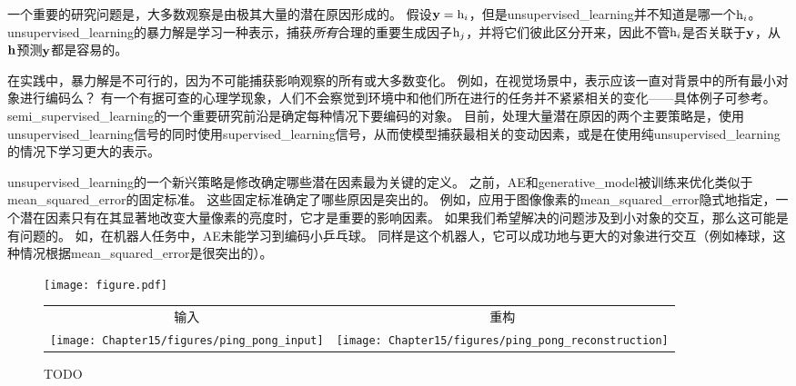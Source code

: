 一个重要的研究问题是，大多数观察是由极其大量的潜在原因形成的。
假设$\mathbf{y} = \mathrm{h}_i$，但是\gls{unsupervised_learning}并不知道是哪一个$\mathrm{h}_i$。
\gls{unsupervised_learning}的暴力解是学习一种表示，捕获\emph{所有}合理的重要生成因子$\mathrm{h}_j$，并将它们彼此区分开来，因此不管$\mathrm{h}_i$是否关联于$\mathbf{y}$，从$\mathbf{h}$预测$\mathbf{y}$都是容易的。


在实践中，暴力解是不可行的，因为不可能捕获影响观察的所有或大多数变化。
例如，在视觉场景中，表示应该一直对背景中的所有最小对象进行编码么？
有一个有据可查的心理学现象，人们不会察觉到环境中和他们所在进行的任务并不紧紧相关的变化——具体例子可参考\citep{simons1998failure}。
\gls{semi_supervised_learning}的一个重要研究前沿是确定每种情况下要编码的对象。
目前，处理大量潜在原因的两个主要策略是，使用\gls{unsupervised_learning}信号的同时使用\gls{supervised_learning}信号，从而使模型捕获最相关的变动因素，或是在使用纯\gls{unsupervised_learning}的情况下学习更大的表示。


\gls{unsupervised_learning}的一个新兴策略是修改确定哪些潜在因素最为关键的定义。
之前，\gls{AE}和\gls{generative_model}被训练来优化类似于\gls{mean_squared_error}的固定标准。
这些固定标准确定了哪些原因是突出的。
例如，应用于图像像素的\gls{mean_squared_error}隐式地指定，一个潜在因素只有在其显著地改变大量像素的亮度时，它才是重要的影响因素。
如果我们希望解决的问题涉及到小对象的交互，那么这可能是有问题的。
如，在机器人任务中，\gls{AE}未能学习到编码小乒乓球。
同样是这个机器人，它可以成功地与更大的对象进行交互（例如棒球，这种情况根据\gls{mean_squared_error}是很突出的）。

\begin{figure}[!htb]
\ifOpenSource
\centerline{\texttt{[image: figure.pdf]}}
\else
\begin{tabular}{cc}
输入 & 重构 \\
\texttt{[image: Chapter15/figures/ping\_pong\_input]} &
\texttt{[image: Chapter15/figures/ping\_pong\_reconstruction]}
\end{tabular}
\fi
\caption{TODO}
\label{fig:chap15_pingpong}
\end{figure}

